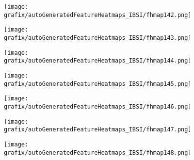 \hspace{\hsp} 
\begin{subfigure}{\wid\textwidth} 
    \centering 
    \caption{\tiny \sffamily {}} 
    \vspace{\vsp} 
    \texttt{[image: grafix/autoGeneratedFeatureHeatmaps\_IBSI/fhmap142.png]} 
\end{subfigure} 
\hspace{\hsp} 
\begin{subfigure}{\wid\textwidth} 
    \centering 
    \caption{\tiny \sffamily {}} 
    \vspace{\vsp} 
    \texttt{[image: grafix/autoGeneratedFeatureHeatmaps\_IBSI/fhmap143.png]} 
\end{subfigure} 
\hspace{\hsp} 
\begin{subfigure}{\wid\textwidth} 
    \centering 
    \caption{\tiny \sffamily {}} 
    \vspace{\vsp} 
    \texttt{[image: grafix/autoGeneratedFeatureHeatmaps\_IBSI/fhmap144.png]} 
\end{subfigure} 
\hspace{\hsp} 
\begin{subfigure}{\wid\textwidth} 
    \centering 
    \caption{\tiny \sffamily {}} 
    \vspace{\vsp} 
    \texttt{[image: grafix/autoGeneratedFeatureHeatmaps\_IBSI/fhmap145.png]} 
\end{subfigure} 
\hspace{\hsp} 
\begin{subfigure}{\wid\textwidth} 
    \centering 
    \caption{\tiny \sffamily {}} 
    \vspace{\vsp} 
    \texttt{[image: grafix/autoGeneratedFeatureHeatmaps\_IBSI/fhmap146.png]} 
\end{subfigure} 
\hspace{\hsp} 
\begin{subfigure}{\wid\textwidth} 
    \centering 
    \caption{\tiny \sffamily {}} 
    \vspace{\vsp} 
    \texttt{[image: grafix/autoGeneratedFeatureHeatmaps\_IBSI/fhmap147.png]} 
\end{subfigure} 
\hspace{\hsp} 
\begin{subfigure}{\wid\textwidth} 
    \centering 
    \caption{\tiny \sffamily {}} 
    \vspace{\vsp} 
    \texttt{[image: grafix/autoGeneratedFeatureHeatmaps\_IBSI/fhmap148.png]} 
\end{subfigure} 
